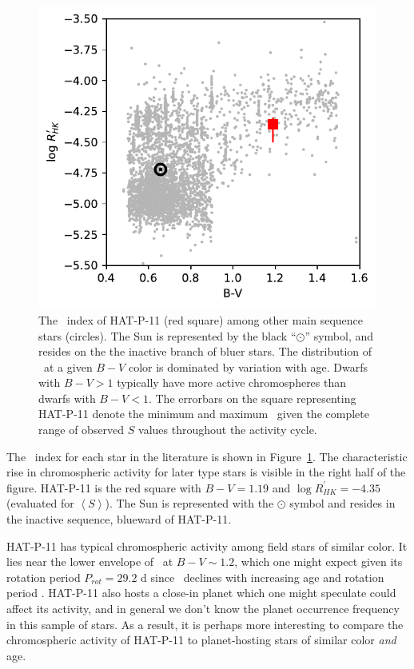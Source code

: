\begin{figure}
\begin{center}
\includegraphics[scale=0.8]{sindex/rprime.pdf}
\end{center}
\caption{The \rprime\ index of HAT-P-11 (red square) among other main sequence stars (circles). The Sun is represented by the black ``$\odot$'' symbol, and resides on the the inactive branch of bluer stars. The distribution of \rprime\ at a given $B-V$ color is dominated by variation with age. Dwarfs with $B-V > 1$ typically have more active chromospheres than dwarfs with $B-V <1$. The errorbars on the square representing HAT-P-11 denote the minimum and maximum \rprime\ given the complete range of observed $S$ values throughout the activity cycle.}
\label{fig:rprime_ms}
\end{figure}

The \rprime\ index for each star in the literature is shown in Figure~\ref{fig:rprime_ms}. The characteristic rise in chromospheric activity for later type stars is visible in the right half of the figure. HAT-P-11 is the red square with $B-V = 1.19$ and $\log R^\prime_{HK} = -4.35$ (evaluated for $\left<S\right>$). The Sun is represented with the $\odot$ symbol and resides in the inactive sequence, blueward of HAT-P-11. 

HAT-P-11 has typical chromospheric activity among field stars of similar color. It lies near the lower envelope of \rprime\ at $B-V\sim1.2$, which one might expect given its rotation period $P_{rot} = 29.2$ d since \rprime\ declines with increasing age and rotation period \citep{Noyes1984}. HAT-P-11 also hosts a close-in planet which one might speculate could affect its activity, and in general we don't know the planet occurrence frequency in this sample of stars. As a result, it is perhaps more interesting to compare the chromospheric activity of HAT-P-11 to planet-hosting stars of similar color \textit{and} age.

